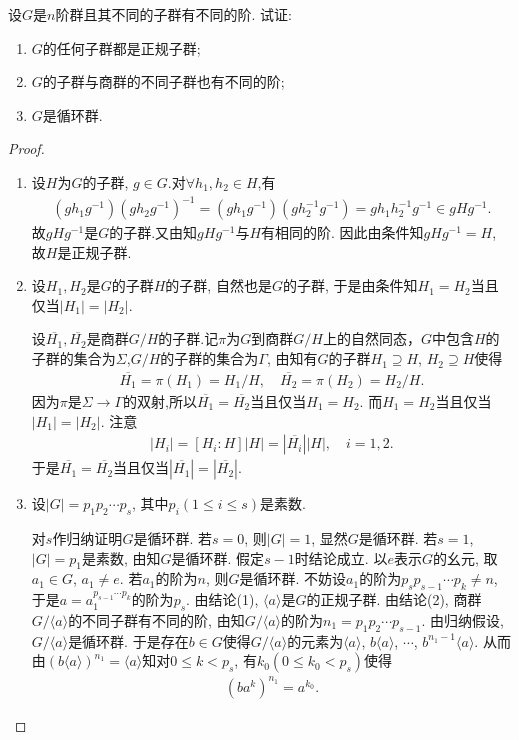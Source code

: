 \documentclass[../../main.tex]{subfiles}%
\begin{document}
\begin{proposition}\label{proposition:有限群不同子群有不同阶的性质}
设$G$是$n$阶群且其不同的子群有不同的阶. 试证:
\begin{enumerate}[(1)]
\item $G$的任何子群都是正规子群;
\item $G$的子群与商群的不同子群也有不同的阶;
\item\label{proposition:有限群不同子群有不同阶的性质-3} $G$是循环群.
\end{enumerate}
\end{proposition}
\begin{proof}
\begin{enumerate}[(1)]
\item 设$H$为$G$的子群, $g\in G$.对$\forall h_1,h_2\in H$,有
\begin{align*}
(gh_1g^{-1})(gh_2g^{-1})^{-1}=(gh_1g^{-1})(gh_2^{-1}g^{-1})=gh_1h_2^{-1}g^{-1}\in gHg^{-1}.
\end{align*}
故$gHg^{-1}$是$G$的子群.又由知$gHg^{-1}$与$H$有相同的阶. 因此由条件知$gHg^{-1}=H$, 故$H$是正规子群.

\item 设$H_1, H_2$是$G$的子群$H$的子群, 自然也是$G$的子群, 于是由条件知$H_1=H_2$当且仅当$|H_1|=|H_2|$.

设$\overline{H_1}, \overline{H_2}$是商群$G/H$的子群.记$\pi$为$G$到商群$G/H$上的自然同态，$G$中包含$H$的子群的集合为$\Sigma$,$G/H$的子群的集合为$\Gamma$, 由知有$G$的子群$H_1\supseteq H$, $H_2\supseteq H$使得
\begin{align*}
\overline{H_1}= \pi(H_1)=H_1/H,\quad \overline{H_2}=\pi(H_2)= H_2/H.
\end{align*}
因为$\pi$是$\Sigma\to \Gamma$的双射,所以$\overline{H_1}=\overline{H_2}$当且仅当$H_1=H_2$. 而$H_1=H_2$当且仅当$|H_1|=|H_2|$. 注意
\begin{align*}
|H_i|=[H_i:H]|H|=|\overline{H_i}||H|,\quad i=1,2.
\end{align*}
于是$\overline{H_1}=\overline{H_2}$当且仅当$|\overline{H_1}|=|\overline{H_2}|$.
\item 设$|G|=p_1p_2\cdots p_s$, 其中$p_i(1\leqslant i\leqslant s)$是素数.

对$s$作归纳证明$G$是循环群. 若$s=0$, 则$|G|=1$, 显然$G$是循环群. 若$s=1$, $|G|=p_1$是素数, 由知$G$是循环群. 假定$s-1$时结论成立. 以$e$表示$G$的幺元, 取$a_1\in G$, $a_1\neq e$. 若$a_1$的阶为$n$, 则$G$是循环群. 不妨设$a_1$的阶为$p_sp_{s-1}\cdots p_k\neq n$, 于是$a=a_1^{p_{s-1}\cdots p_k}$的阶为$p_s$. 由结论(1), $\langle a\rangle$是$G$的正规子群. 由结论(2), 商群$G/\langle a\rangle$的不同子群有不同的阶, 由知$G/\langle a\rangle$的阶为$n_1=p_1p_2\cdots p_{s-1}$. 由归纳假设, $G/\langle a\rangle$是循环群. 于是存在$b\in G$使得$G/\langle a\rangle$的元素为$\langle a\rangle$, $b\langle a\rangle$, $\cdots$, $b^{n_1-1}\langle a\rangle$. 从而由$(b\langle a\rangle)^{n_1}=\langle a \rangle$知对$0\leqslant k<p_s$, 有$k_0(0\leqslant k_0<p_s)$使得
\begin{align*}
(ba^k)^{n_1}=a^{k_0}.
\end{align*}


\end{enumerate}
\end{proof}
\end{document}
